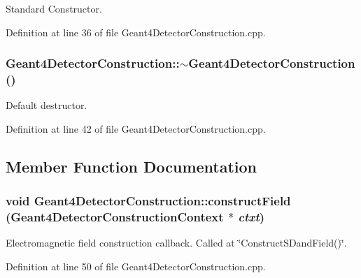 Standard Constructor. 

Definition at line 36 of file Geant4DetectorConstruction.cpp.\hypertarget{class_d_d4hep_1_1_simulation_1_1_geant4_detector_construction_a78fcc174794d8ef64b402c1c296c43db}{
\subsubsection[{$\sim$Geant4DetectorConstruction}]{\setlength{\rightskip}{0pt plus 5cm}Geant4DetectorConstruction::$\sim$Geant4DetectorConstruction ()}}
\label{class_d_d4hep_1_1_simulation_1_1_geant4_detector_construction_a78fcc174794d8ef64b402c1c296c43db}


Default destructor. 

Definition at line 42 of file Geant4DetectorConstruction.cpp.

\subsection{Member Function Documentation}
\hypertarget{class_d_d4hep_1_1_simulation_1_1_geant4_detector_construction_af7b296f1aa62b4d836c6275108953208}{
\subsubsection[{constructField}]{\setlength{\rightskip}{0pt plus 5cm}void Geant4DetectorConstruction::constructField ({\bf Geant4DetectorConstructionContext} $\ast$ {\em ctxt})}}
\label{class_d_d4hep_1_1_simulation_1_1_geant4_detector_construction_af7b296f1aa62b4d836c6275108953208}


Electromagnetic field construction callback. Called at \char`\"{}ConstructSDandField()\char`\"{}. 

Definition at line 50 of file Geant4DetectorConstruction.cpp.

